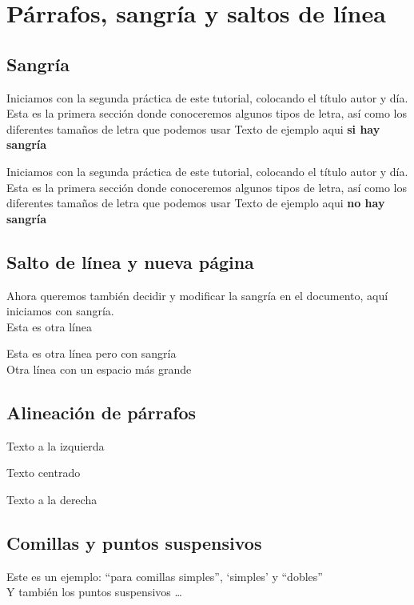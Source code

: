 \documentclass[12pt]{article}
\begin{document}
\section{Párrafos, sangría y saltos de línea}
\subsection{Sangría}
Iniciamos con la segunda práctica de este tutorial,
colocando el título autor y día. Esta es la primera
sección donde conoceremos algunos tipos de letra, así
como los diferentes tamaños de letra que podemos usar
Texto de ejemplo aqui \textbf{si hay sangría} 

\noindent Iniciamos con la segunda práctica de este tutorial,
colocando el título autor y día. Esta es la primera
sección donde conoceremos algunos tipos de letra, así
como los diferentes tamaños de letra que podemos usar
Texto de ejemplo aqui \textbf{no hay sangría} 

\newpage

\subsection{Salto de línea y nueva página}
Ahora queremos también decidir y modificar la sangría en el
documento, aquí iniciamos con sangría. \\
Esta es otra línea \par
Esta es otra línea pero con sangría \\[0.5cm]
Otra línea con un espacio más grande

\subsection{Alineación de párrafos}
\begin{flushleft}
Texto a la izquierda
\end{flushleft}
\begin{center}
Texto centrado
\end{center}
\begin{flushright}
Texto a la derecha
\end{flushright}

\subsection{Comillas y puntos suspensivos}
Este es un ejemplo: ``para comillas simples'', `simples' y ``dobles'' \\
Y también los puntos suspensivos \dots
\end{document}
